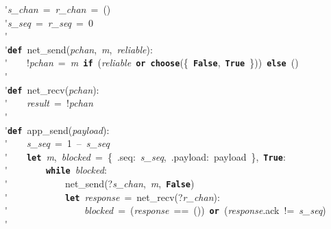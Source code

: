 \'\>\textit{s\_chan}~=~\textit{r\_chan}~=~()\\

\'\>\textit{s\_seq}~=~\textit{r\_seq}~=~0\\

\'\>\\

\'\>\texttt{\textbf{def}}~net\_send(\textit{pchan},~\textit{m},~\textit{reliable}):\\

\'\>~~~~!\textit{pchan}~=~\textit{m}~\texttt{\textbf{if}}~(\textit{reliable}~\texttt{\textbf{or}}~\texttt{\textbf{choose}}(\{~\texttt{\textbf{False}},~\texttt{\textbf{True}}~\}))~\texttt{\textbf{else}}~()\\

\'\>\\

\'\>\texttt{\textbf{def}}~net\_recv(\textit{pchan}):\\

\'\>~~~~\textit{result}~=~!\textit{pchan}\\

\'\>\\

\'\>\texttt{\textbf{def}}~app\_send(\textit{payload}):\\

\'\>~~~~\textit{s\_seq}~=~1~--~\textit{s\_seq}\\

\'\>~~~~\texttt{\textbf{let}}~\textit{m},~\textit{blocked}~=~\{~.seq:~\textit{s\_seq},~.payload:~payload~\},~\texttt{\textbf{True}}:\\

\'\>~~~~~~~~\texttt{\textbf{while}}~\textit{blocked}:\\

\'\>~~~~~~~~~~~~net\_send(?\textit{s\_chan},~\textit{m},~\texttt{\textbf{False}})\\

\'\>~~~~~~~~~~~~\texttt{\textbf{let}}~\textit{response}~=~net\_recv(?\textit{r\_chan}):\\

\'\>~~~~~~~~~~~~~~~~\textit{blocked}~=~(\textit{response}~==~())~\texttt{\textbf{or}}~(\textit{response}.ack~!=~\textit{s\_seq})\\

\'\>~~~~~~~~~~~~\\

